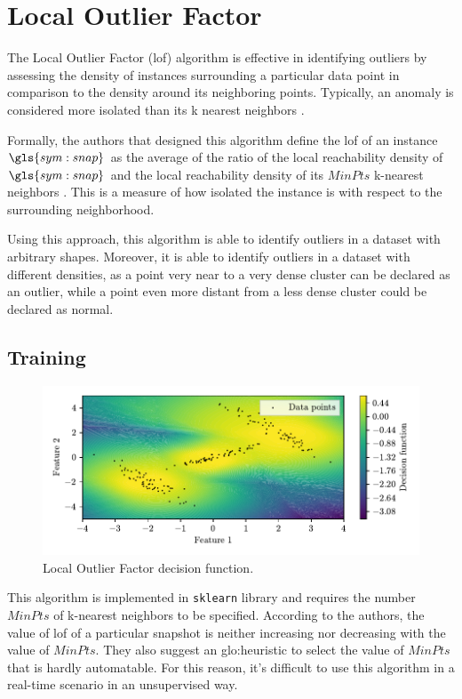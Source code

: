 \section{Local Outlier Factor}
\label{sec:LocalOutlierFactor}


The Local Outlier Factor (\gls{lof}) algorithm is effective in identifying outliers by assessing the density of instances surrounding a particular data point in comparison to the density around its neighboring points. Typically, an anomaly is considered more isolated than its k nearest neighbors . 

Formally, the authors that designed this algorithm define the \gls{lof} of an instance $\gls{sym:snap}$ as the average of the ratio of the local reachability density of $\gls{sym:snap}$ and the local reachability density of its $MinPts$ k-nearest neighbors \cite{breunig2000lof}. This is a measure of how isolated the instance is with respect to the surrounding neighborhood. 

Using this approach, this algorithm is able to identify outliers in a dataset with arbitrary shapes. Moreover, it is able to identify outliers in a dataset with different densities, as a point very near to a very dense cluster can be declared as an outlier, while a point even more distant from a less dense cluster could be declared as normal.

\subsection{Training}
\label{sec:lof_train}
\begin{figure}
    \centering
    \includegraphics{images/LOF/Figure_1.pdf}
    \caption{Local Outlier Factor decision function.}
    \label{fig:LocalOutlierFactor}
\end{figure}
This algorithm is implemented in \texttt{sklearn} library and requires the number $MinPts$ of k-nearest neighbors to be specified. According to the authors, the value of \gls{lof} of a particular snapshot is neither increasing nor decreasing with the value of $MinPts$. They also suggest an \gls{glo:heuristic} to select the value of $MinPts$ that is hardly automatable. 
For this reason, it's difficult to use this algorithm in a real-time scenario in an unsupervised way.

